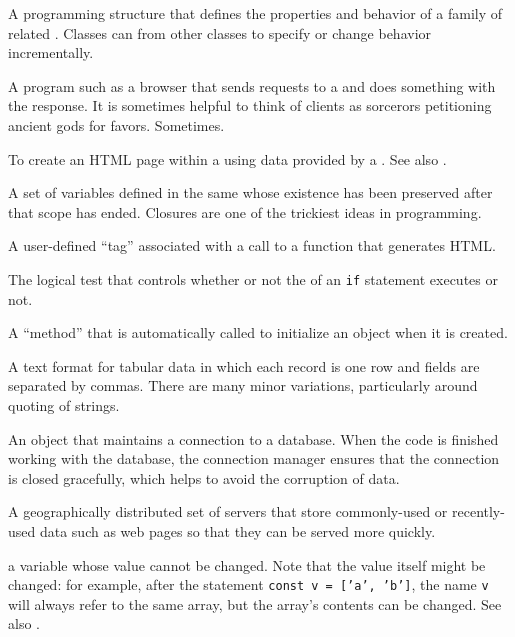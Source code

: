 \begin{description}
A programming structure that defines the properties and behavior of a family
of related . Classes can  from other
classes to specify or change behavior incrementally.

A program such as a browser that sends requests to a  and
does something with the response. It is sometimes helpful to think of clients
as sorcerors petitioning ancient gods for favors. Sometimes.

To create an HTML page within a  using data provided by a
. See also .

A set of variables defined in the same  whose existence has
been preserved after that scope has ended. Closures are one of the trickiest
ideas in programming.

A user-defined ``tag'' associated with a call to a function that generates HTML.

The logical test that controls whether or not the 
of an \texttt{if} statement executes or not.

A ``method'' that is automatically called to initialize an object when it is created.

A text format for tabular data in which each record is one row and fields are
separated by commas. There are many minor variations, particularly around
quoting of strings.

An object that maintains a connection to a database. When the code is
finished working with the database, the connection manager ensures that the
connection is closed gracefully, which helps to avoid the corruption of data.

A geographically distributed set of servers that store commonly-used or
recently-used data such as web pages so that they can be served more quickly.

a variable whose value cannot be changed. Note that the value itself might be
changed: for example, after the statement \texttt{const\ v\ =\ ['a',\ 'b']}, the name \texttt{v}
will always refer to the same array, but the array's contents can be changed.
See also .


\end{description}
